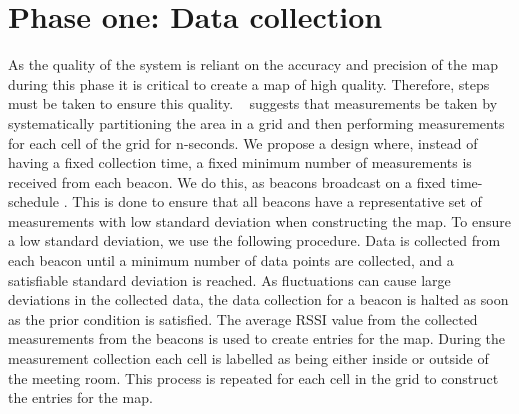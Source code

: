 \section{Phase one: Data collection}\label{sec:knn_implementation}
As the quality of the system is reliant on the accuracy and precision of the map during this phase it is critical to create a map of high quality.
Therefore, steps must be taken to ensure this quality. 
\citeauthor{improving_indoor_localization}~\cite{improving_indoor_localization} suggests that measurements be taken by systematically partitioning the area in a grid and then performing measurements for each cell of the grid for n-seconds. 
We propose a design where, instead of having a fixed collection time, a fixed minimum number of measurements is received from each beacon.
We do this, as beacons broadcast on a fixed time-schedule \cite{apple2023ibeacon}.
This is done to ensure that all beacons have a representative set of measurements with low standard deviation when constructing the map.
To ensure a low standard deviation, we use the following procedure.
Data is collected from each beacon until a minimum number of data points are collected, and a  satisfiable standard deviation is reached.
As fluctuations can cause large deviations in the collected data, the data collection for a beacon is halted as soon as the prior condition is satisfied.
The average RSSI value from the collected measurements from the beacons is used to create entries for the map.
During the measurement collection each cell is labelled as being either inside or outside of the meeting room.
This process is repeated for each cell in the grid to construct the entries for the map. 


